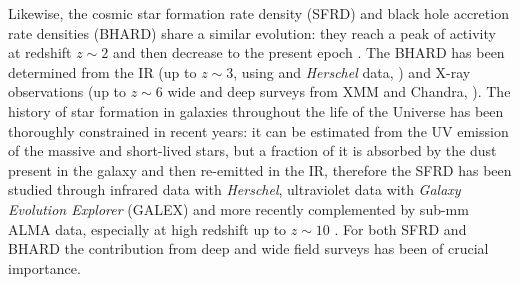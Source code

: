 
Likewise, the cosmic star formation rate density (SFRD) and black hole accretion rate densities (BHARD) share a similar evolution: they reach a peak of activity at redshift $z\sim2$ and then decrease to the present epoch \citep{1998MNRAS.293L..49B, 2014MNRAS.439.2736D, 2014ARA&A..52..415M}.
The BHARD has been determined from the IR (up to $z\sim3$, using and \emph{Herschel} data, \citet{2014MNRAS.439.2736D}) and X-ray observations (up to $z\sim 6$ wide and deep surveys from XMM and Chandra, \citet{2018MNRAS.473.2378V}).
The history of star formation in galaxies throughout the life of the Universe has been thoroughly constrained in recent years: it can be estimated from the UV emission of the massive and short-lived stars, but a fraction of it is absorbed by the dust present in the galaxy and then re-emitted in the IR, therefore the SFRD has been studied through infrared data with \emph{Herschel}, ultraviolet data with \emph{Galaxy Evolution Explorer} (GALEX) \citep[see][for a review]{2014ARA&A..52..415M} and more recently complemented by sub-mm ALMA data, especially at high redshift up to $z\sim10$ \citep{2020ApJ...902..112B,2020A&A...643A...8G}. For both SFRD and BHARD the contribution from deep and wide field surveys has been of crucial importance.

